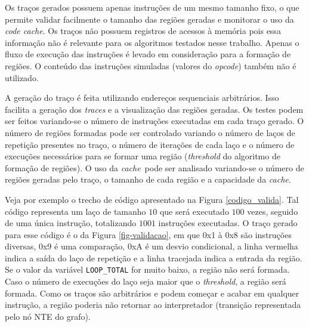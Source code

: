 \documentclass[12pt,twoside]{article}
\newcommand{\ccache}{\emph{code cache}}
\newcommand{\cache}{\emph{cache}}
\begin{document}
Os traços gerados possuem apenas instruções de um mesmo tamanho fixo, o que permite validar facilmente o tamanho das regiões geradas e monitorar o uso da \ccache. Os traços não possuem registros de acessos à memória pois essa informação não é relevante para os algoritmos testados nesse trabalho. Apenas o fluxo de execução das instruções é levado em consideração para a formação de regiões. O conteúdo das instruções simuladas (valores do \emph{opcode}) também não é utilizado. 

A geração do traço é feita utilizando endereços sequenciais arbitrários. Isso facilita a geração dos \emph{traces} e a visualização das regiões geradas. Os testes podem ser feitos variando-se o número de instruções executadas em cada traço gerado. O número de regiões formadas pode ser controlado variando o número de laços de repetição presentes no traço, o número de iterações de cada laço e o número de execuções necessários para se formar uma região (\emph{threshold} do algoritmo de formação de regiões). O uso da \cache~pode ser analisado variando-se o número de regiões geradas pelo traço, o tamanho de cada região e a capacidade da \cache.%

Veja por exemplo o trecho de código apresentado na Figura \ref{codigo_valida}. Tal código representa um laço de tamanho $10$ que será executado $100$ vezes, seguido de uma única instrução, totalizando $1001$ instruções executadas. O traço gerado para esse código é o da Figura \ref{fig-validacao}, em que 0x1 à 0x8 são instruções diversas, 0x9 é uma comparação, 0xA é um desvio condicional, a linha vermelha indica a saída do laço de repetição e a linha tracejada indica a entrada da região. Se o valor da variável \texttt{LOOP\_TOTAL} for muito baixo, a região não será formada. Caso o número de execuções do laço seja maior que o \emph{threshold}, a região será formada. Como os traços são arbitrários e podem começar e acabar em qualquer instrução, a região poderia não retornar ao interpretador (transição representada pelo nó NTE do grafo).
\end{document}
